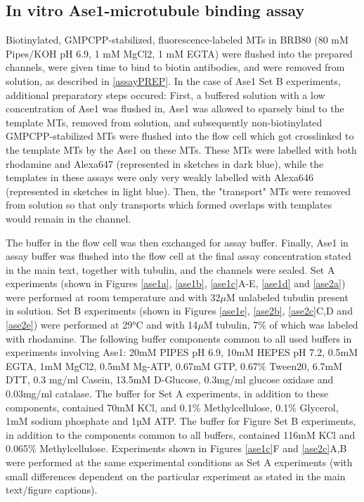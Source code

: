 \subsection{In vitro Ase1-microtubule binding assay}
\label{Ase1AssayMethods}
Biotinylated, GMPCPP-stabilized, fluorescence-labeled MTs in BRB80 (80 mM Pipes/KOH pH 6.9, 1 mM MgCl2, 1 mM EGTA) were flushed into the prepared channels, were given time to bind to biotin antibodies, and were removed from solution, as described in \autoref{assayPREP}. In the case of Ase1 Set B experiments, additional preparatory steps occured: First, a buffered solution with a low concentration of Ase1 was flushed in, Ase1 was allowed to sparsely bind to the template MTs, removed from solution, and subsequently non-biotinylated GMPCPP-stabilized MTs were flushed into the flow cell which got crosslinked to the template MTs by the Ase1 on these MTs. These MTs were labelled with both rhodamine and Alexa647 (represented in sketches in dark blue), while the templates in these assays were only very weakly labelled with Alexa646 (represented in sketches in light blue). Then, the "transport" MTs were removed from solution so that only transports which formed overlaps with templates would remain in the channel. \par 
The buffer in the flow cell was then exchanged for assay buffer. Finally, Ase1 in assay buffer was flushed into the flow cell at the final assay concentration stated in the main text, together with tubulin, and the channels were sealed. Set A experiments (shown in Figures \ref{ase1a}, \ref{ase1b}, \ref{ase1c}A-E, \ref{ase1d} and \ref{ase2a}) were performed at room temperature and with 32$\mu$M unlabeled tubulin present in solution. Set B experiments (shown in Figures \ref{ase1e}, \ref{ase2b}, \ref{ase2c}C,D and \ref{ase2e}) were performed at 29°C and with 14$\mu$M tubulin, 7\% of which was labeled with rhodamine. The following buffer components common to all used buffers in experiments involving Ase1: 20mM PIPES pH 6.9, 10mM HEPES pH 7.2, 0.5mM EGTA, 1mM MgCl2, 0.5mM Mg-ATP, 0.67mM GTP, 0.67\% Tween20, 6.7mM DTT, 0.3 mg/ml Casein, 13.5mM D-Glucose, 0.3mg/ml glucose oxidase and 0.03mg/ml catalase. The buffer for Set A experiments, in addition to these components, contained 70mM KCl, and 0.1\% Methylcellulose, 0.1\% Glycerol, 1mM sodium phosphate and 1µM ATP. The buffer for Figure Set B experiments, in addition to the components common to all buffers, contained 116mM KCl and 0.065\% Methylcellulose. Experiments shown in Figures \ref{ase1c}F and \ref{ase2c}A,B were performed at the same experimental conditions as Set A experiments (with small differences dependent on the particular experiment as stated in the main text/figure captions).


